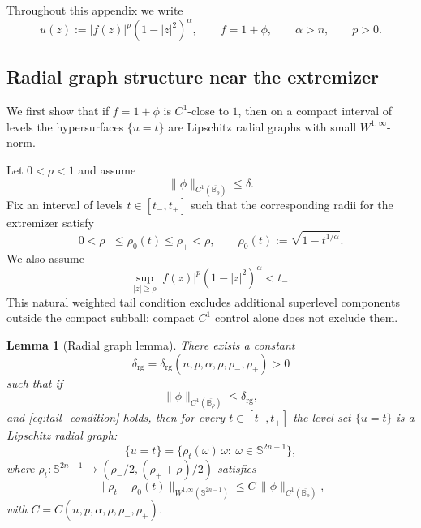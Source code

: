 \documentclass[11pt]{amsart}
\theoremstyle{plain}
\newtheorem{lemma}[theorem]{Lemma}
\theoremstyle{definition}
\theoremstyle{remark}
\newcommand{\B}{\mathbb{B}}
\newcommand{\Sn}{\mathbb{S}^{2n-1}}
\begin{document}
Throughout this appendix we write
\[
u(z):=|f(z)|^p(1-|z|^2)^\alpha,
\qquad f=1+\phi,
\qquad \alpha>n,
\qquad p>0.
\]

\subsection{Radial graph structure near the extremizer}\label{subsec:verify_nearly_spherical}

We first show that if \(f=1+\phi\) is \(C^1\)-close to \(1\), then on a compact interval of levels
the hypersurfaces \(\{u=t\}\) are Lipschitz radial graphs with small \(W^{1,\infty}\)-norm.

Let \(0<\rho<1\) and assume
\[
\|\phi\|_{C^1(\overline{\B_\rho})}\le \delta.
\]
Fix an interval of levels \(t\in[t_-,t_+]\) such that the corresponding radii for the extremizer satisfy
\[
0<\rho_- \le \rho_0(t)\le \rho_+<\rho,
\qquad
\rho_0(t):=\sqrt{1-t^{1/\alpha}}.
\]
We also assume
\begin{equation}\label{eq:tail_condition}
\sup_{|z|\ge\rho}|f(z)|^p(1-|z|^2)^\alpha<t_-.
\end{equation}
This natural weighted tail condition excludes additional superlevel components
outside the compact subball; compact $C^1$ control alone does not exclude them.

\begin{lemma}[Radial graph lemma]\label{lem:IFT_radial_graph}
There exists a constant
\[
\delta_{\mathrm{rg}}=\delta_{\mathrm{rg}}(n,p,\alpha,\rho,\rho_-,\rho_+)>0
\]
such that if
\[
\|\phi\|_{C^1(\overline{\B_\rho})}\le \delta_{\mathrm{rg}},
\]
and \eqref{eq:tail_condition} holds, then for every \(t\in[t_-,t_+]\) the
level set \(\{u=t\}\) is a Lipschitz radial graph:
\begin{equation}\label{eq:rho_graph}
\{u=t\}=\{\rho_t(\omega)\,\omega:\ \omega\in\Sn\},
\end{equation}
where \(\rho_t:\Sn\to(\rho_-/2,(\rho_++\rho)/2)\) satisfies
\begin{equation}\label{eq:rho_est}
\|\rho_t-\rho_0(t)\|_{W^{1,\infty}(\Sn)}
\le
C\,\|\phi\|_{C^1(\overline{\B_\rho})},
\end{equation}
with \(C=C(n,p,\alpha,\rho,\rho_-,\rho_+)\).
\end{lemma}
\end{document}

